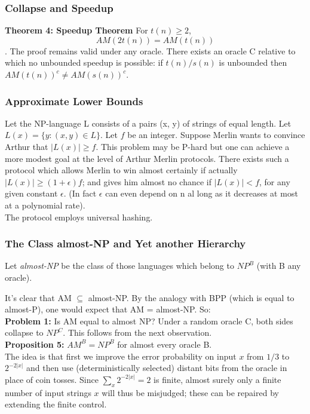 \documentclass{beamer}
\begin{document}
\begin{frame}
\frametitle{Collapse and Speedup}
\textbf{Theorem 4: Speedup Theorem}
For $t(n) \geq 2$, $$AM(2t(n)) = AM(t(n))$$.
The proof remains valid under any oracle. 
There exists an oracle C relative to which no unbounded speedup is possible: if $t(n) / s(n)$ is unbounded then $AM(t(n))^c \neq AM(s(n))^c$. 
\end{frame}

\begin{frame}
\frametitle{Approximate Lower Bounds}

Let the NP-language L consists of a pairs (x, y) of strings of equal length. Let $L(x) = \{y: (x, y) \in L\}$. Let $f$ be an integer. Suppose Merlin wants to convince Arthur that $|L(x)| \geq f$. This problem may be P-hard but one can achieve a more modest goal at the level of Arthur Merlin protocols. There exists such a protocol which allows Merlin to win almost certainly if actually $|L(x)| \geq (1 + \epsilon)f$; and gives him almost no chance if $|L(x)| < f$, for any given constant $\epsilon$. (In fact $\epsilon$ can even depend on n al long as it decreases at most at a polynomial rate). \\
The protocol employs universal hashing.
\end{frame}

\begin{frame}
\frametitle{The Class almost-NP and Yet another Hierarchy}
Let \textit{almost-NP} be the class of those languages which belong to $NP^B$ (with B any oracle).

It's clear that AM $\subseteq$ almost-NP. By the analogy with BPP (which is equal to almost-P), one would expect that AM = almost-NP. So:\\
\textbf{Problem 1:} Is AM equal to almost NP?
Under a random oracle C, both sides collapse to $NP^C$. This follows from the next observation.\\
\textbf{Proposition 5:} $AM^B = NP^B$ for almost every oracle B.\\
The idea is that first we improve the error probability on input $x$ from $1/3$ to $2^{-2|x|}$ and then use (deterministically selected) distant bits from the oracle in place of coin tosses. 
Since $\sum_x 2^{-2|x|} = 2$ is finite, almost surely only a finite number of input strings $x$ will thus be misjudged; these can be repaired by extending the finite control.
\end{frame}
\end{document}
